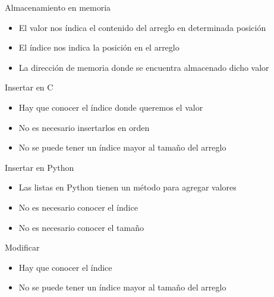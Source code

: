 \documentclass{beamer}
\newcommand{\Rplus}{\protect\hspace{-.1em}\protect\raisebox{.35ex}{\smaller{\smaller\textbf{+}}}}
\newcommand{\Cpp}{\mbox{C\Rplus\Rplus}\hspace{3pt}}
\begin{document}
\begin{frame}{Almacenamiento en memoria}
	\begin{itemize}
		\item El valor nos \'indica el contenido del arreglo en determinada posici\'on
		\item El \'indice nos indica la posici\'on en el arreglo
		\item La direcci\'on de memoria donde se encuentra almacenado dicho valor	
	\end{itemize}
	\centering
\end{frame}


\begin{frame}{Insertar en \Cpp}
	\begin{itemize}
		\item Hay que conocer el \'indice donde queremos el valor
		\item No es necesario insertarlos en orden
		\item No se puede tener un \'indice mayor al tamaño del arreglo
	\end{itemize}
	\centering
\end{frame}

\begin{frame}{Insertar en Python}
	\begin{itemize}
		\item Las listas en Python tienen un m\'etodo para agregar valores
		\item No es necesario conocer el \'indice
		\item No es necesario conocer el tamaño 
	\end{itemize}
\end{frame}

\begin{frame}{Modificar}
	\begin{itemize}
		\item Hay que conocer el \'indice
		\item No se puede tener un \'indice mayor al tamaño del arreglo
	\end{itemize}
\end{frame}
\end{document}
